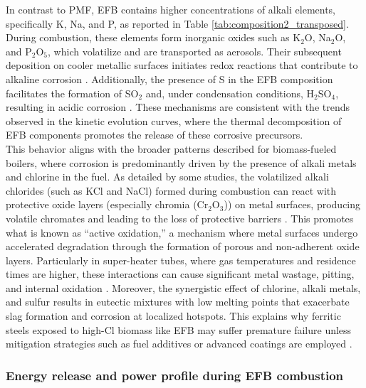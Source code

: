 \documentclass[preprint,12pt]{elsarticle}
\begin{document}
In contrast to PMF, EFB contains higher concentrations of alkali elements, specifically K, Na, and P, as reported in Table \ref{tab:composition2_transposed}. During combustion, these elements form inorganic oxides such as K$_2$O, Na$_2$O, and P$_2$O$_5$, which volatilize and are transported as aerosols. Their subsequent deposition on cooler metallic surfaces initiates redox reactions that contribute to alkaline corrosion \cite{BayonaRaquis}. Additionally, the presence of S in the EFB composition facilitates the formation of SO$_2$ and, under condensation conditions, H$_2$SO$_4$, resulting in acidic corrosion \cite{BayonaRaquis}. These mechanisms are consistent with the trends observed in the kinetic evolution curves, where the thermal decomposition of EFB components promotes the release of these corrosive precursors.\\

This behavior aligns with the broader patterns described for biomass-fueled boilers, where corrosion is predominantly driven by the presence of alkali metals and chlorine in the fuel. As detailed by some studies, the volatilized alkali chlorides (such as KCl and NaCl) formed during combustion can react with protective oxide layers (especially chromia (Cr$_2$O$_3$)) on metal surfaces, producing volatile chromates and leading to the loss of protective barriers \cite{BayonaRaquis}. This promotes what is known as “active oxidation,” a mechanism where metal surfaces undergo accelerated degradation through the formation of porous and non-adherent oxide layers. Particularly in super-heater tubes, where gas temperatures and residence times are higher, these interactions can cause significant metal wastage, pitting, and internal oxidation \cite{BayonaRaquis}. Moreover, the synergistic effect of chlorine, alkali metals, and sulfur results in eutectic mixtures with low melting points that exacerbate slag formation and corrosion at localized hotspots. This explains why ferritic steels exposed to high-Cl biomass like EFB may suffer premature failure unless mitigation strategies such as fuel additives or advanced coatings are employed \cite{Mudgal2014}.\\

\subsubsection{Energy release and power profile during EFB combustion}
\label{Energy release and power profile during EFB combustion}\\
\end{document}
